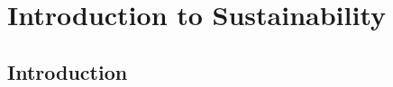 \chapter{Introduction to Sustainability}
\label{chap:intro:sustain}
\lipsum[1-2]
\section{Introduction}\label{sec:intro:sustain:intro}
\lipsum[2-4]